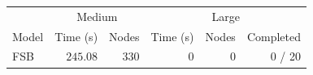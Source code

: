 \begin{scriptsize}

\begin{table}[ht]
	\centering
	\begin{tabular}{lrrrrr}
	    \toprule
		&  \multicolumn{2}{c}{Medium} & \multicolumn{3}{c}{Large}\\ \cmidrule(lr){2-3} \cmidrule(lr){4-6} 
		Model & Time (s) & Nodes & Time (s) & Nodes & Completed\\
		\midrule
		FSB &  $245.08  $ & $330 $ & 0 & 0 & 0 / 20\\

\end{tabular}
\end{table}
\end{scriptsize}

